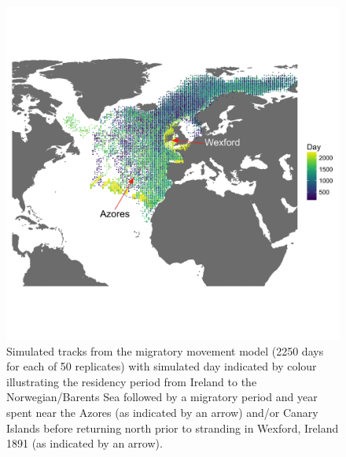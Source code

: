 \documentclass[a4paper,12pt]{article}
\begin{document}


\begin{figure}
  \centering
  \includegraphics[width = \linewidth]{figures/Figure-2-migratory-model-full-map.png}
  \caption{Simulated tracks from the migratory movement model (2250 days for each of 50 replicates) with simulated day indicated by colour illustrating the residency period from Ireland to the Norwegian/Barents Sea followed by a migratory period and year spent near the Azores (as indicated by an arrow) and/or Canary Islands before returning north prior to stranding in Wexford, Ireland 1891 (as indicated by an arrow). }
  \label{fig2}
\end{figure}
\end{document}
